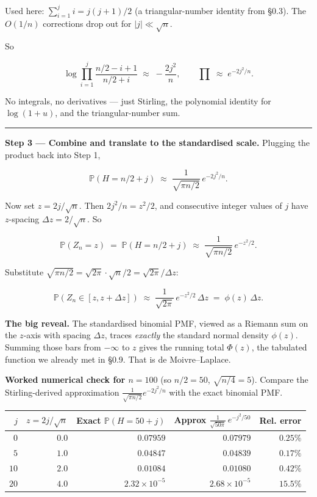 \documentclass[
  10pt,
  twoside]{book}
\newcounter{none} %
\begin{document}
Used here: \(\sum_{i=1}^{j} i = j(j+1)/2\) (a triangular-number identity
from §0.3). The \(O(1/n)\) corrections drop out for
\(|j| \ll \sqrt{n}\).

So

\[\log \prod_{i=1}^{j} \frac{n/2 - i + 1}{n/2 + i} \;\approx\; -\frac{2 j^2}{n}, \qquad \prod \;\approx\; e^{-2 j^2 / n}.\]

No integrals, no derivatives --- just Stirling, the polynomial identity
for \(\log(1+u)\), and the triangular-number sum.

\begin{center}\rule{0.5\linewidth}{0.5pt}\end{center}

\textbf{Step 3 --- Combine and translate to the standardised scale.}
Plugging the product back into Step 1,

\[\mathbb{P}(H = n/2 + j) \;\approx\; \frac{1}{\sqrt{\pi n / 2}} \, e^{-2 j^2 / n}.\]

Now set \(z = 2j / \sqrt{n}\). Then \(2 j^2 / n = z^2/2\), and
consecutive integer values of \(j\) have \(z\)-spacing
\(\Delta z = 2/\sqrt{n}\). So

\[\mathbb{P}(Z_n = z) \;=\; \mathbb{P}(H = n/2 + j) \;\approx\; \frac{1}{\sqrt{\pi n / 2}} \, e^{-z^2/2}.\]

Substitute
\(\sqrt{\pi n/2} = \sqrt{2\pi} \cdot \sqrt{n}/2 = \sqrt{2\pi}/\Delta z\):

\[\mathbb{P}(Z_n \in [z, z + \Delta z]) \;\approx\; \frac{1}{\sqrt{2\pi}} \, e^{-z^2/2} \, \Delta z \;=\; \phi(z)\,\Delta z.\]

\textbf{The big reveal.} The standardised binomial PMF, viewed as a
Riemann sum on the \(z\)-axis with spacing \(\Delta z\), traces
\emph{exactly} the standard normal density \(\phi(z)\). Summing those
bars from \(-\infty\) to \(z\) gives the running total \(\Phi(z)\), the
tabulated function we already met in §0.9. That is de Moivre--Laplace.

\textbf{Worked numerical check for \(n = 100\)} (so \(n/2 = 50\),
\(\sqrt{n/4} = 5\)). Compare the Stirling-derived approximation
\(\frac{1}{\sqrt{\pi n/2}} e^{-2 j^2 / n}\) with the exact binomial PMF.

{\def\LTcaptype{none} %
\begin{table}[H]
\centering
\begin{tabular}{|r|r|r|r|r|}
\toprule
\(j\) & \(z = 2j/\sqrt{n}\) & Exact \(\mathbb{P}(H = 50 + j)\) & Approx \(\frac{1}{\sqrt{50\pi}}\, e^{-j^2/50}\) & Rel. error \\
\midrule



\(0\) & \(0.0\) & \(0.07959\) & \(0.07979\) & \(0.25\%\) \\
\(5\) & \(1.0\) & \(0.04847\) & \(0.04839\) & \(0.17\%\) \\
\(10\) & \(2.0\) & \(0.01084\) & \(0.01080\) & \(0.42\%\) \\
\(20\) & \(4.0\) & \(2.32 \times 10^{-5}\) & \(2.68 \times 10^{-5}\) &
\(15.5\%\) \\
\bottomrule
\end{tabular}
\end{table}
}
\end{document}
